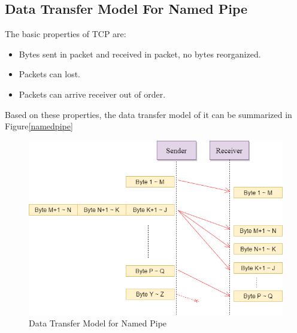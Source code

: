 \subsection{Data Transfer Model For Named Pipe}
The basic properties of TCP are:
\begin{itemize}
  \item Bytes sent in packet and received in packet, no bytes reorganized.
  \item Packets can lost.
  \item Packets can arrive receiver out of order.
\end{itemize}
Based on these properties, the data transfer model of it can be summarized in Figure\ref{namedpipe}
\begin{figure}[h]
\centerline{\includegraphics[scale=0.6]{Figures/namedpipe}}
\caption{Data Transfer Model for Named Pipe}
\label{tcp}
\end{figure}
